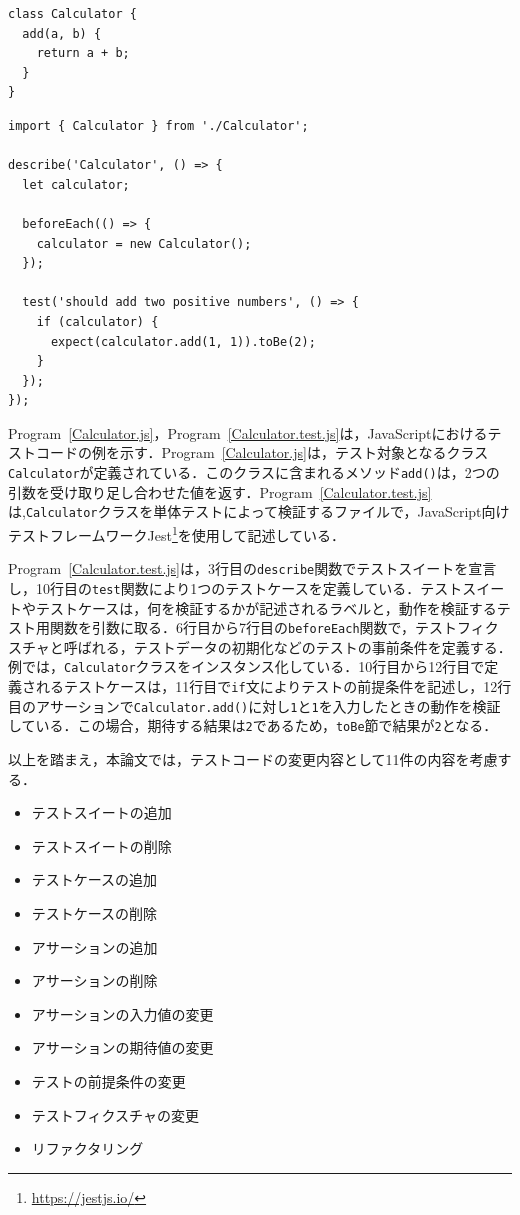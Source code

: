 \documentclass[11pt,dvipdfmx]{jreport}
\begin{document}
\begin{lstlisting}[caption=Calculator.js, label=Calculator.js]
class Calculator {
  add(a, b) {
    return a + b;
  }
}
\end{lstlisting}

\begin{lstlisting}[caption=Calculator.test.js, label=Calculator.test.js]
import { Calculator } from './Calculator';

describe('Calculator', () => {
  let calculator;

  beforeEach(() => {
    calculator = new Calculator();
  });

  test('should add two positive numbers', () => {
    if (calculator) {
      expect(calculator.add(1, 1)).toBe(2);
    }
  });
});
\end{lstlisting}


Program~\ref{Calculator.js}，Program~\ref{Calculator.test.js}は，JavaScriptにおけるテストコードの例を示す．Program~\ref{Calculator.js}は，テスト対象となるクラス{\verb|Calculator|}が定義されている．このクラスに含まれるメソッド{\verb|add()|}は，2つの引数を受け取り足し合わせた値を返す．Program~\ref{Calculator.test.js}は,{\verb|Calculator|}クラスを単体テストによって検証するファイルで，JavaScript向けテストフレームワークJest\footnote{\url{https://jestjs.io/}}を使用して記述している．

Program~\ref{Calculator.test.js}は，3行目の{\verb|describe|}関数でテストスイートを宣言し，10行目の{\verb|test|}関数により1つのテストケースを定義している．テストスイートやテストケースは，何を検証するかが記述されるラベルと，動作を検証するテスト用関数を引数に取る．6行目から7行目の{\verb|beforeEach|}関数で，テストフィクスチャと呼ばれる，テストデータの初期化などのテストの事前条件を定義する．例では，{\verb|Calculator|}クラスをインスタンス化している．10行目から12行目で定義されるテストケースは，11行目で{\verb|if|}文によりテストの前提条件を記述し，12行目のアサーションで{\verb|Calculator.add()|}に対し{\verb|1|}と{\verb|1|}を入力したときの動作を検証している．この場合，期待する結果は{\verb|2|}であるため，{\verb|toBe|}節で結果が{\verb|2|}となる．

以上を踏まえ，本論文では，テストコードの変更内容として11件の内容を考慮する．

\begin{itemize}
  \setlength{\itemsep}{0cm}
  \item テストスイートの追加
  \item テストスイートの削除
  \item テストケースの追加
  \item テストケースの削除
  \item アサーションの追加
  \item アサーションの削除
  \item アサーションの入力値の変更
  \item アサーションの期待値の変更
  \item テストの前提条件の変更
  \item テストフィクスチャの変更
  \item リファクタリング
\end{itemize}
\end{document}
